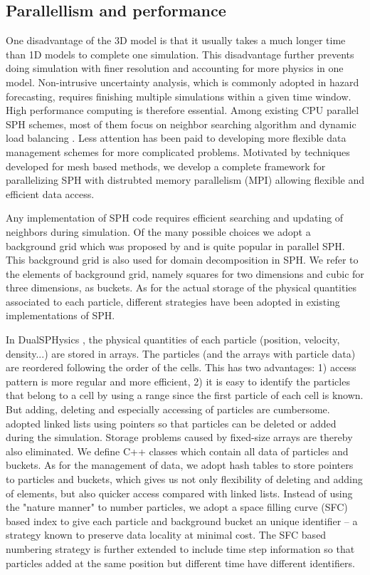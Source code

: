 \documentclass[journal abbreviation, manuscript]{copernicus}
\begin{document}
\subsection{Parallellism and performance}
One disadvantage of the 3D model is that it usually takes a much longer time than 1D models to complete one simulation. This disadvantage further prevents doing simulation with finer resolution and accounting for more physics in one model. Non-intrusive uncertainty analysis, which is commonly adopted in hazard forecasting, requires finishing multiple simulations within a given time window. High performance computing is therefore essential. Among existing CPU parallel SPH schemes, most of them focus on neighbor searching algorithm and dynamic load balancing \citep[eg. ][] {ferrari2009new, crespo2015dualsphysics}. Less attention has been paid to developing more flexible data management schemes for more complicated problems. Motivated by techniques developed for mesh based methods, we develop a complete framework for parallelizing SPH with distrubted memory parallelism (MPI) allowing flexible and efficient data access.

Any implementation of SPH code requires efficient searching and updating of neighbors during simulation. Of the many possible choices we adopt a background grid which was proposed by \citet {monaghan1985refined} and is quite popular in parallel SPH. This background grid is also used for domain decomposition in SPH. We refer to the elements of background grid, namely squares for two dimensions and cubic for three dimensions, as buckets. 
As for the actual storage of the physical quantities associated to each particle, different strategies have been adopted in existing implementations of SPH.

In DualSPHysics \citep {crespo2015dualsphysics}, the physical quantities of each particle (position, velocity, density...) are stored in arrays. The particles (and the arrays with particle data) are reordered following the order of the cells. This has two advantages: 1) access pattern is more regular and more efficient, 2) it is easy to identify the particles that belong to a cell by using a range since the first particle of each cell is known. But adding, deleting and especially accessing of particles are cumbersome. \citet {ferrari2009new} adopted linked lists using pointers so that particles can be deleted or added during the simulation. Storage problems caused by fixed-size arrays are thereby also eliminated. We define C++ classes which contain all data of particles and buckets. As for the management of data, we adopt hash tables to store pointers to particles and buckets, which gives us not only flexibility of deleting and adding of elements, but also quicker access compared with linked lists. Instead of using the "nature manner" to number particles, we adopt a space filling curve (SFC) based index to give each particle and background bucket an unique identifier -- a strategy known to preserve data locality at minimal cost. The SFC based numbering strategy is further extended to include time step information so that particles added at the same position but different time have different identifiers. 
\end{document}
